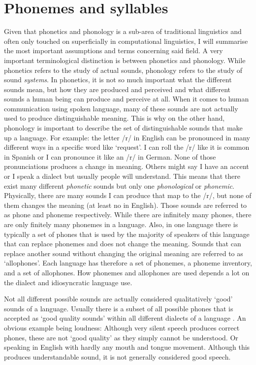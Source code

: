 \section{Phonemes and syllables}
\label{phonology}
Given that phonetics and phonology is a sub-area of traditional linguistics and often only touched on superficially in computational linguistics, I will summarise the most important assumptions and terms concerning said field. A very important terminological distinction is between phonetics and phonology. While phonetics refers to the study of actual sounds, phonology refers to the study of sound \textit{systems}. In phonetics, it is not so much important what the different sounds mean, but how they are produced and perceived and what different sounds a human being can produce and perceive at all. When it comes to human communication using spoken language, many of these sounds are not actually used to produce distinguishable meaning. This is why on the other hand, phonology is important to describe the set of distinguishable sounds that make up a language. For example: the letter /r/ in English can be pronounced in many different ways in a specific word like `request'. I can roll the /r/ like it is common in Spanish or I can pronounce it like an /r/ in German. None of those pronunciations produces a change in meaning. Others might say I have an accent or I speak a dialect but usually people will understand. This means that there exist many different \textit{phonetic} sounds but only one \textit{phonological} or \textit{phonemic}. Physically, there are many sounds I can produce that map to the /r/, but none of them changes the meaning (at least no in English). Those sounds are referred to as phone and phoneme respectively. While there are infinitely many phones, there are only finitely many phonemes in a language. Also, in one language there is typically a set of phones that is used by the majority of speakers of this language that can replace phonemes and does not change the meaning. Sounds that can replace another sound without changing the original meaning are referred to as `allophones'. Each language has therefore a set of phonemes, a phoneme inventory, and a set of allophones. How phonemes and allophones are used depends a lot on the dialect and idiosyncratic language use.  

Not all different possible sounds are actually considered qualitatively `good' sounds of a language. Usually there is a subset of all possible phones that is accepted as `good quality sounds' within all different dialects of a language \citep{Intro.2007}. An obvious example being loudness: Although very silent speech produces correct phones, these are not `good quality' as they simply cannot be understood. Or speaking in English with hardly any mouth and tongue movement. Although this produces understandable sound, it is not generally considered good speech. 

